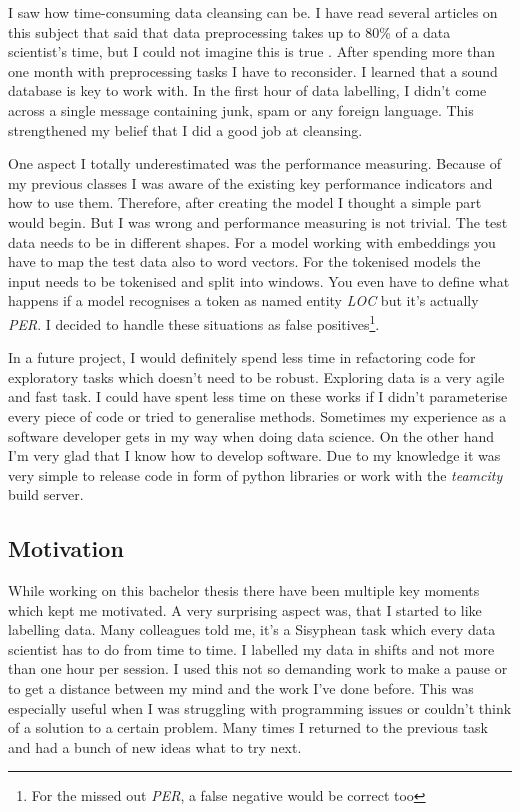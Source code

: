I saw how time-consuming data cleansing can be. I have read several articles on this subject that said that data preprocessing takes up to 80\% of a data scientist's time, but I could not imagine this is true \cite{naman18}. After spending more than one month with preprocessing tasks I have to reconsider. I learned that a sound database is key to work with. In the first hour of data labelling, I didn't come across a single message containing junk, spam or any foreign language. This strengthened my belief that I did a good job at cleansing.

One aspect I totally underestimated was the performance measuring. Because of my previous classes I was aware of the existing key performance indicators and how to use them. Therefore, after creating the model I thought a simple part would begin. But I was wrong and performance measuring is not trivial. The test data needs to be in different shapes. For a model working with embeddings you have to map the test data also to word vectors. For the tokenised models the input needs to be tokenised and split into windows. You even have to define what happens if a model recognises a token as named entity \emph{LOC} but it's actually \emph{PER}. I decided to handle these situations as false positives\footnote{For the missed out \emph{PER}, a false negative would be correct too}.

In a future project, I would definitely spend less time in refactoring code for exploratory tasks which doesn't need to be robust. Exploring data is a very agile and fast task. I could have spent less time on these works if I didn't parameterise every piece of code or tried to generalise methods. Sometimes my experience as a software developer gets in my way when doing data science. On the other hand I'm very glad that I know how to develop software. Due to my knowledge it was very simple to release code in form of python libraries or work with the \emph{teamcity} build server.

\subsection{Motivation}

While working on this bachelor thesis there have been multiple key moments which kept me motivated. A very surprising aspect was, that I started to like labelling data. Many colleagues told me, it's a Sisyphean task which every data scientist has to do from time to time. I labelled my data in shifts and not more than one hour per session. I used this not so demanding work to make a pause or to get a distance between my mind and the work I've done before. This was especially useful when I was struggling with programming issues or couldn't think of a solution to a certain problem. Many times I returned to the previous task and had a bunch of new ideas what to try next.

